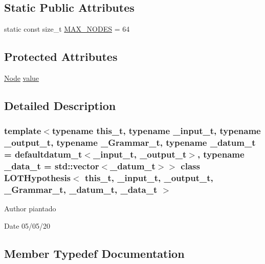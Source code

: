 \subsection*{Static Public Attributes}
\begin{DoxyCompactItemize}
\item 
static const size\+\_\+t \hyperlink{class_l_o_t_hypothesis_a4f12a3df12284ee93fa124ad02a9a361}{M\+A\+X\+\_\+\+N\+O\+D\+ES} = 64
\end{DoxyCompactItemize}
\subsection*{Protected Attributes}
\begin{DoxyCompactItemize}
\item 
\hyperlink{class_node}{Node} \hyperlink{class_l_o_t_hypothesis_ac8a3c198b5210ea032901b8f7070d6e8}{value}
\end{DoxyCompactItemize}


\subsection{Detailed Description}
\subsubsection*{template$<$typename this\+\_\+t, typename \+\_\+input\+\_\+t, typename \+\_\+output\+\_\+t, typename \+\_\+\+Grammar\+\_\+t, typename \+\_\+datum\+\_\+t = defaultdatum\+\_\+t$<$\+\_\+input\+\_\+t, \+\_\+output\+\_\+t$>$, typename \+\_\+data\+\_\+t = std\+::vector$<$\+\_\+datum\+\_\+t$>$$>$\newline
class L\+O\+T\+Hypothesis$<$ this\+\_\+t, \+\_\+input\+\_\+t, \+\_\+output\+\_\+t, \+\_\+\+Grammar\+\_\+t, \+\_\+datum\+\_\+t, \+\_\+data\+\_\+t $>$}

\begin{DoxyAuthor}{Author}
piantado 
\end{DoxyAuthor}
\begin{DoxyDate}{Date}
05/05/20 
\end{DoxyDate}


\subsection{Member Typedef Documentation}
\mbox{\label{class_l_o_t_hypothesis_ab635fd5106a80f66c2ce04123b969611}} 
